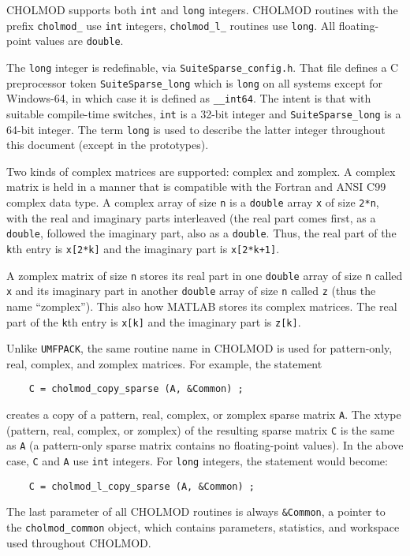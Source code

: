 \documentclass[11pt]{article}
\begin{document}
CHOLMOD supports both {\tt int} and {\tt long} integers.  CHOLMOD
routines with the prefix {\tt cholmod\_} use {\tt int} integers,
{\tt cholmod\_l\_} routines use {\tt long}.  All floating-point
values are {\tt double}.

The {\tt long} integer is redefinable, via {\tt SuiteSparse\_config.h}.
That file defines a C preprocessor token {\tt SuiteSparse\_long} which is
{\tt long} on all systems except for Windows-64, in which case it is
defined as {\tt \_\_int64}.  The intent is that with suitable compile-time
switches, {\tt int} is a 32-bit integer and {\tt SuiteSparse\_long} is a 64-bit
integer.  The term {\tt long} is used to describe the latter
integer throughout this document (except in the prototypes).

Two kinds of complex matrices are supported: complex and zomplex.
A complex matrix is held in a manner that is compatible with the
Fortran and ANSI C99 complex data type.  A complex array of size {\tt n}
is a {\tt double} array {\tt x} of size {\tt 2*n}, with the real and imaginary
parts interleaved (the real part comes first, as a {\tt double}, followed the
imaginary part, also as a {\tt double}.  Thus, the real part of the {\tt k}th
entry is {\tt x[2*k]} and the imaginary part is {\tt x[2*k+1]}.

A zomplex matrix of size {\tt n} stores its real part in one
{\tt double} array of size {\tt n} called {\tt x} and its imaginary part
in another {\tt double} array of size {\tt n} called {\tt z} (thus the
name ``zomplex'').  This also how MATLAB stores its complex matrices.
The real part of the {\tt k}th entry is {\tt x[k]} and the imaginary part is
{\tt z[k]}.

Unlike {\tt UMFPACK}, the same routine name in CHOLMOD is used for pattern-only,
real, complex, and zomplex matrices.  For example, the statement
\begin{verbatim}
    C = cholmod_copy_sparse (A, &Common) ;
\end{verbatim}
creates a copy of a pattern, real, complex, or zomplex sparse matrix {\tt A}.
The xtype (pattern, real, complex, or zomplex) of the resulting sparse matrix {\tt C}
is the same as {\tt A} (a pattern-only sparse matrix contains no floating-point
values).  In the above case, {\tt C} and {\tt A} use {\tt int} integers.
For {\tt long} integers, the statement would become:
\begin{verbatim}
    C = cholmod_l_copy_sparse (A, &Common) ;
\end{verbatim}
The last parameter of all CHOLMOD routines is always {\tt \&Common},
a pointer to the
{\tt cholmod\_common} object, which contains parameters, statistics,
and workspace used throughout CHOLMOD.
\end{document}
